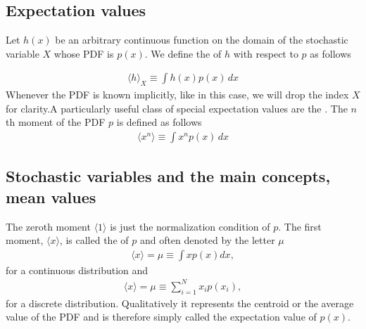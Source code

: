 \documentclass[letterpaper,10pt,english]{sphinxmanual}
\begin{document}
\subsection{Expectation values}
\label{\detokenize{chapter3:expectation-values}}
Let \(h(x)\) be an arbitrary continuous function on the domain of the stochastic
variable \(X\) whose PDF is \(p(x)\). We define the 
of \(h\) with respect to \(p\) as follows




\begin{equation*}
\begin{split}
\begin{equation}
\langle h \rangle_X \equiv \int\! h(x)p(x)\,dx
\label{eq:expectation_value_of_h_wrt_p} \tag{2}
\end{equation}
\end{split}
\end{equation*}
Whenever the PDF is known implicitly, like in this case, we will drop
the index \(X\) for clarity.A particularly useful class of special expectation values are the
. The \(n\)\sphinxhyphen{}th moment of the PDF \(p\) is defined as
follows
\begin{equation*}
\begin{split}
\langle x^n \rangle \equiv \int\! x^n p(x)\,dx
\end{split}
\end{equation*}

\subsection{Stochastic variables and the main concepts, mean values}
\label{\detokenize{chapter3:stochastic-variables-and-the-main-concepts-mean-values}}
The zero\sphinxhyphen{}th moment \(\langle 1\rangle\) is just the normalization condition of
\(p\). The first moment, \(\langle x\rangle\), is called the  of \(p\)
and often denoted by the letter \(\mu\)
\begin{equation*}
\begin{split}
\langle x\rangle  = \mu \equiv \int x p(x)dx,
\end{split}
\end{equation*}
for a continuous distribution and
\begin{equation*}
\begin{split}
\langle x\rangle  = \mu \equiv \sum_{i=1}^N x_i p(x_i),
\end{split}
\end{equation*}
for a discrete distribution.
Qualitatively it represents the centroid or the average value of the
PDF and is therefore simply called the expectation value of \(p(x)\).
\end{document}
